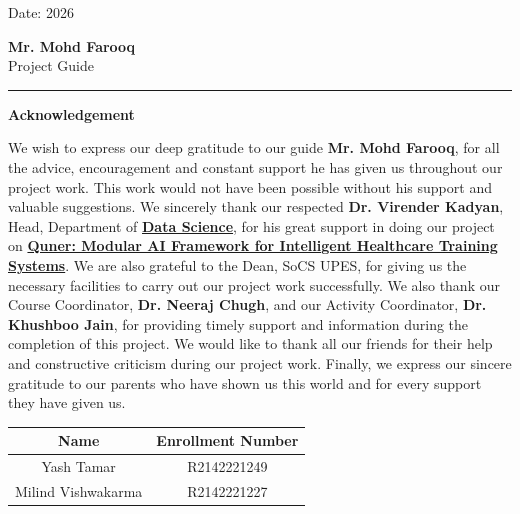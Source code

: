 \documentclass{article}
\begin{document}
\vspace{3cm}

\noindent
Date: \underline{\hspace{3cm}} 2026
\hfill
\begin{minipage}{6cm}
    \centering
    \textbf{Mr. Mohd Farooq}\\
    Project Guide
    \vspace{1.5cm}
\end{minipage}

\vspace{5cm}
\hrule
\newpage

\begin{center}
    \Large \textbf{Acknowledgement}
\end{center}

We wish to express our deep gratitude to our guide \textbf{Mr. Mohd Farooq}, for all the advice, encouragement and constant support he has given us throughout our project work. This work would not have been possible without his support and valuable suggestions. We sincerely thank our respected \textbf{Dr. Virender Kadyan}, Head, Department of \underline{\textbf{Data Science}}, for his great support in doing our project on \underline{\textbf{Quner: Modular AI Framework for Intelligent Healthcare Training Systems}}. We are also grateful to the Dean, SoCS UPES, for giving us the necessary facilities to carry out our project work successfully. We also thank our Course Coordinator, \textbf{Dr. Neeraj Chugh}, and our Activity Coordinator, \textbf{Dr. Khushboo Jain}, for providing timely support and information during the completion of this project. We would like to thank all our friends for their help and constructive criticism during our project work. Finally, we express our sincere gratitude to our parents who have shown us this world and for every support they have given us.

\vspace{1cm}

\begin{center}
    \begin{tabular}{|c|c|}
        \hline
        \textbf{Name} & \textbf{Enrollment Number} \\
        \hline \hline
        Yash Tamar & R2142221249 \\
        \hline
        Milind Vishwakarma & R2142221227 \\
        \hline
    \end{tabular}
\end{center}
\end{document}
